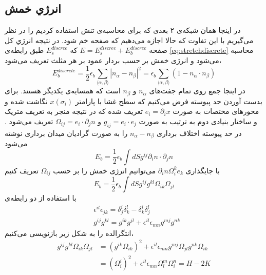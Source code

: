 \setRL



\subsection{
انرژي خمش
}
در اینجا همان شبکه‌ی ۲ بعدی که برای محاسبه‌ی تنش استفاده کردیم را در نظر می‌گیریم با این تفاوت که حالا اجازه می‌دهیم که صفحه خم شود. در نتیجه انرژي کل صفحه 
$E=E_s^{discree}+E_b^{discree}$
که $E_s^{discree}$
طبق رابطه‌ی 
\ref{eq:stretchdiscrete}
محاسبه می‌شود و انرژی خمش بر حسب بردار عمود بر هر مثلث تعریف می‌شود،
\begin{equation}
E_b^{discrete}=\frac{1}{2}\epsilon_b\sum_{\langle\alpha,\beta\rangle}|n_\alpha-n_\beta|^2=\epsilon_b\sum_{\langle\alpha,\beta\rangle}\left(1-n_\alpha\cdot n_\beta\right)
\label{eq:bending}
\end{equation}
در اینجا جمع روی تمام جفت‌های 
$n_\alpha$
و 
$n_\beta$ 
است که همسایه‌ی یکدیگر هستند. برای بدست‌ آوردن حد پیوسته‌ فرض می‌کنیم که سطح غشا با پارامتر 
$x(\sigma_i)$
نگاشت شده و محورهای مختصات به صورت 
$e_i=\partial_ix$
تعریف شده که در نتیجه منجر به تعریف متریک و ساختار بنیادی دوم
 به ترتیب به صورت 
$g_{ij}=e_i\cdot e_j$
و
$\Omega_{ij}=e_i\cdot\partial_jn$
تعریف می‌شود 
\cite{DubrovinModernGeometry}
. در حد پیوسته اختلاف برداری 
$n_\alpha-n_\beta$
را به صورت گرادیان میدان برداری نوشته می‌شود
\begin{equation}
E_b=\frac{1}{2}\epsilon_b\int dSg^{ij}\partial_in\cdot\partial_jn
\end{equation}
با جایگذاری 
$\partial_in\Omega_i^ke_k$
می‌توانیم انرژی خمش را بر حسب 
$\Omega_{ij}$
تعریف کنیم
\begin{equation}
E_b=\frac{1}{2}\epsilon_b\int dSg^{ij}g^{kl}\Omega_{ik}\Omega_{jl}
\end{equation}
با استفاده از دو رابطه‌ی 
\begin{equation}
\begin{aligned}
&\epsilon^{il}\epsilon_{jk}=\delta_j^i\delta_k^l-\delta_k^i\delta_j^l\\
&g^{ij}g^{kl}=g^{ik}g^{jl}+\epsilon^{il}\epsilon_{mn}g^{mj}g^{nk}
\end{aligned}
\end{equation}
انتگرالده را به شکل زیر بازنویسی می‌کنیم،
\begin{equation}
\begin{aligned}
g^{ij}g^{kl}\Omega_{ik}\Omega_{jl}&=(g^{ik}\Omega_{ik})^2+\epsilon^{il}\epsilon_{mn}g^{mj}\Omega_{jl}g^{nk}\Omega_{ik}\\
&=(\Omega_i^i)^2+\epsilon^{il}\epsilon_{mn}\Omega_l^m\Omega_i^n=H-2K
\end{aligned}
\end{equation}
